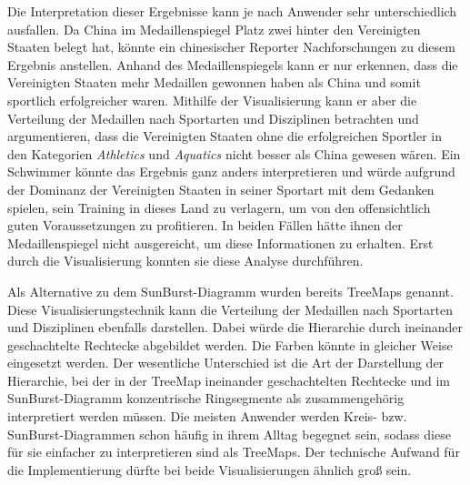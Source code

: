 Die Interpretation dieser Ergebnisse kann je nach Anwender sehr unterschiedlich ausfallen. Da China im Medaillenspiegel Platz zwei hinter den Vereinigten Staaten belegt hat, könnte ein chinesischer Reporter Nachforschungen zu diesem Ergebnis anstellen. Anhand des Medaillenspiegels kann er nur erkennen, dass die Vereinigten Staaten mehr Medaillen gewonnen haben als China und somit sportlich erfolgreicher waren. Mithilfe der Visualisierung kann er aber die Verteilung der Medaillen nach Sportarten und Disziplinen betrachten und argumentieren, dass die Vereinigten Staaten ohne die erfolgreichen Sportler in den Kategorien \textit{Athletics} und \textit{Aquatics} nicht besser als China gewesen wären. Ein Schwimmer könnte das Ergebnis ganz anders interpretieren und würde aufgrund der Dominanz der Vereinigten Staaten in seiner Sportart mit dem Gedanken spielen, sein Training in dieses Land zu verlagern, um von den offensichtlich guten Voraussetzungen zu profitieren. In beiden Fällen hätte ihnen der Medaillenspiegel nicht ausgereicht, um diese Informationen zu erhalten. Erst durch die Visualisierung konnten sie diese Analyse durchführen.

Als Alternative zu dem SunBurst-Diagramm wurden bereits TreeMaps genannt. Diese Visualisierungstechnik kann die Verteilung der Medaillen nach Sportarten und Disziplinen ebenfalls darstellen. Dabei würde die Hierarchie durch ineinander geschachtelte Rechtecke abgebildet werden. Die Farben könnte in gleicher Weise eingesetzt werden. Der wesentliche Unterschied ist die Art der Darstellung der Hierarchie, bei der in der TreeMap ineinander geschachtelten Rechtecke und im SunBurst-Diagramm konzentrische Ringsegmente  als zusammengehörig interpretiert werden müssen. Die meisten Anwender werden Kreis- bzw. SunBurst-Diagrammen schon häufig in ihrem Alltag begegnet sein, sodass diese für sie einfacher zu interpretieren sind als TreeMaps. Der technische Aufwand für die Implementierung dürfte bei beide Visualisierungen ähnlich groß sein.

